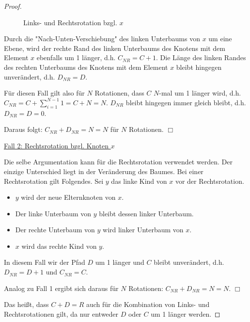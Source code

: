 \documentclass{article}
\begin{document}
\begin{proof}
\begin{figure}[H]
  \label{fig:aufg12-left-rot-x}
  \caption{Links- und Rechtsrotation bzgl. $x$}
\end{figure}

Durch die "Nach-Unten-Verschiebung" des linken Unterbaums von $x$ um eine Ebene,
wird der rechte Rand des linken Unterbaums des Knotens mit dem Element $x$
ebenfalls um 1 l{\"a}nger, d.h. $C_{NR} = C + 1$. Die L{\"a}nge des linken Randes
des rechten Unterbaums des Knotens mit dem Element $x$ bleibt hingegen
unver{\"a}ndert, d.h. $D_{NR} = D$.

F{\"u}r diesen Fall gilt also f{\"u}r $N$ Rotationen, dass $C$
$N$-mal um 1 l{\"a}nger wird, d.h.
$C_{NR} = C + \sum^{N - 1}_{i = 1} 1 = C + N = N$. $D_{NR}$ bleibt hingegen
immer gleich bleibt, d.h. $D_{NR} = D = 0$.

Daraus folgt: $C_{NR} + D_{NR} = N = N$ f{\"u}r $N$ Rotationen. \hfill$\Box$

\underline{Fall 2: Rechtsrotation bzgl. Knoten $x$}

Die selbe Argumentation kann f{\"u}r die Rechtsrotation verwendet werden. Der
einzige Unterschied liegt in der Ver{\"a}nderung des Baumes. Bei einer
Rechtsrotation gilt Folgendes. Sei $y$ das linke Kind von $x$ vor der
Rechtsrotation.
{\parskip0pt\begin{itemize}
  \item $y$ wird der neue Elternknoten von $x$.
  \item Der linke Unterbaum von $y$ bleibt dessen linker Unterbaum.
  \item Der rechte Unterbaum von $y$ wird linker Unterbaum von $x$.
  \item $x$ wird das rechte Kind von $y$.
\end{itemize}}

In diesem Fall wir der Pfad $D$ um 1 l{\"a}nger und $C$ bleibt unver{\"a}ndert,
d.h. $D_{NR} = D + 1$ und $C_{NR} = C$.

Analog zu Fall 1 ergibt sich daraus f{\"u}r $N$ Rotationen:
$C_{NR} + D_{NR} = N = N$. \hfill$\Box$

Das hei{\ss}t, dass $C + D = R$ auch f{\"u}r die Kombination von Links- und
Rechtsrotationen gilt, da nur entweder $D$ oder $C$ um 1 l{\"a}nger werden.
\end{proof}
\end{document}
